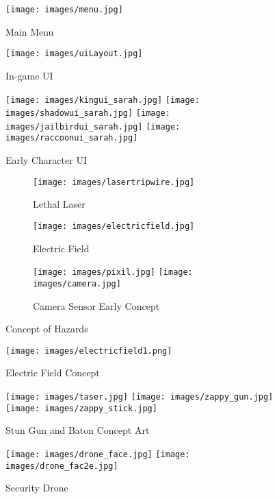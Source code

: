 \documentclass[10pt]{report}
\begin{document}
\begin{figure}[H]
	\texttt{[image: images/menu.jpg]}
    \caption{Main Menu}
\end{figure}

\begin{figure}[H]
	\texttt{[image: images/uiLayout.jpg]}
    \caption{In-game UI}
\end{figure}

\begin{figure}[H]
    \centering
	\texttt{[image: images/kingui\_sarah.jpg]}
	\texttt{[image: images/shadowui\_sarah.jpg]}
	\texttt{[image: images/jailbirdui\_sarah.jpg]}
	\texttt{[image: images/raccoonui\_sarah.jpg]}
    \caption{Early Character UI}
\end{figure}

\begin{figure}[H]
    \centering
    \begin{subfigure}[b]{0.4\linewidth}
        \texttt{[image: images/lasertripwire.jpg]}
        \caption{Lethal Laser}
    \end{subfigure}
    \begin{subfigure}[b]{0.4\linewidth}
        \texttt{[image: images/electricfield.jpg]}
        \caption{Electric Field}
    \end{subfigure}
    \begin{subfigure}[b]{\linewidth}
        \centering
        \texttt{[image: images/pixil.jpg]}
        \texttt{[image: images/camera.jpg]}
        \caption{Camera Sensor Early Concept}
    \end{subfigure}
    \caption{Concept of Hazards}
\end{figure}

\begin{figure}[H]
	\texttt{[image: images/electricfield1.png]}
    \caption{Electric Field Concept}
\end{figure}

\begin{figure}[H]
    \centering
	\texttt{[image: images/taser.jpg]}
	\texttt{[image: images/zappy\_gun.jpg]}
	\texttt{[image: images/zappy\_stick.jpg]}
    \caption{Stun Gun and Baton Concept Art}
\end{figure}

\begin{figure}[H]
    \centering
	\texttt{[image: images/drone\_face.jpg]}
	\texttt{[image: images/drone\_fac2e.jpg]}
    \caption{Security Drone}
\end{figure}
\end{document}
